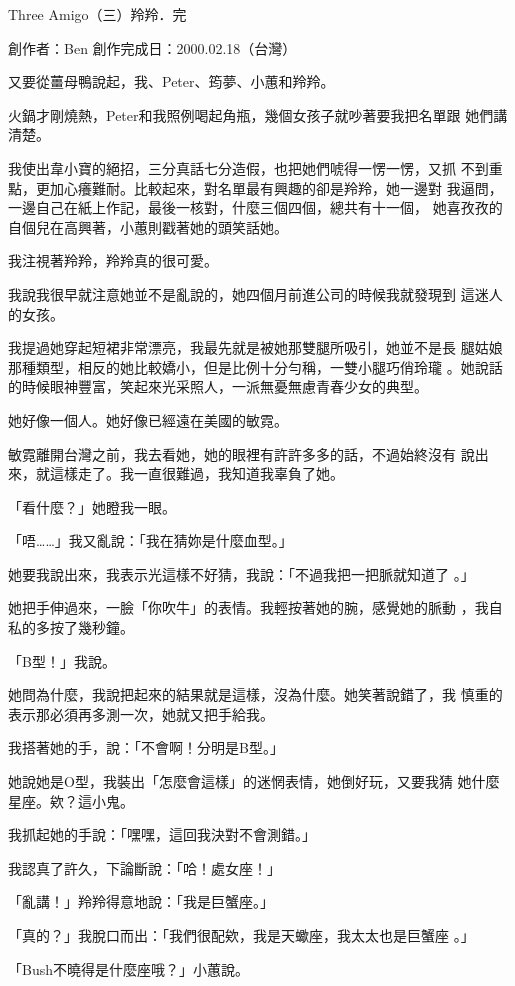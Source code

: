 



Three Amigo（三）羚羚．完

創作者：Ben
創作完成日：2000.02.18（台灣）　


又要從薑母鴨說起，我、Peter、筠夢、小蕙和羚羚。

火鍋才剛燒熱，Peter和我照例喝起角瓶，幾個女孩子就吵著要我把名單跟
她們講清楚。

我使出韋小寶的絕招，三分真話七分造假，也把她們唬得一愣一愣，又抓
不到重點，更加心癢難耐。比較起來，對名單最有興趣的卻是羚羚，她一邊對
我逼問，一邊自己在紙上作記，最後一核對，什麼三個四個，總共有十一個，
她喜孜孜的自個兒在高興著，小蕙則戳著她的頭笑話她。

我注視著羚羚，羚羚真的很可愛。

我說我很早就注意她並不是亂說的，她四個月前進公司的時候我就發現到
這迷人的女孩。

我提過她穿起短裙非常漂亮，我最先就是被她那雙腿所吸引，她並不是長
腿姑娘那種類型，相反的她比較嬌小，但是比例十分勻稱，一雙小腿巧俏玲瓏
。她說話的時候眼神豐富，笑起來光采照人，一派無憂無慮青春少女的典型。

她好像一個人。她好像已經遠在美國的敏霓。

敏霓離開台灣之前，我去看她，她的眼裡有許許多多的話，不過始終沒有
說出來，就這樣走了。我一直很難過，我知道我辜負了她。

「看什麼？」她瞪我一眼。

「唔……」我又亂說：「我在猜妳是什麼血型。」

她要我說出來，我表示光這樣不好猜，我說：「不過我把一把脈就知道了
。」

她把手伸過來，一臉「你吹牛」的表情。我輕按著她的腕，感覺她的脈動
，我自私的多按了幾秒鐘。

「B型！」我說。

她問為什麼，我說把起來的結果就是這樣，沒為什麼。她笑著說錯了，我
慎重的表示那必須再多測一次，她就又把手給我。

我搭著她的手，說：「不會啊！分明是B型。」

她說她是O型，我裝出「怎麼會這樣」的迷惘表情，她倒好玩，又要我猜
她什麼星座。欸？這小鬼。

我抓起她的手說：「嘿嘿，這回我決對不會測錯。」

我認真了許久，下論斷說：「哈！處女座！」

「亂講！」羚羚得意地說：「我是巨蟹座。」

「真的？」我脫口而出：「我們很配欸，我是天蠍座，我太太也是巨蟹座
。」

「Bush不曉得是什麼座哦？」小蕙說。

